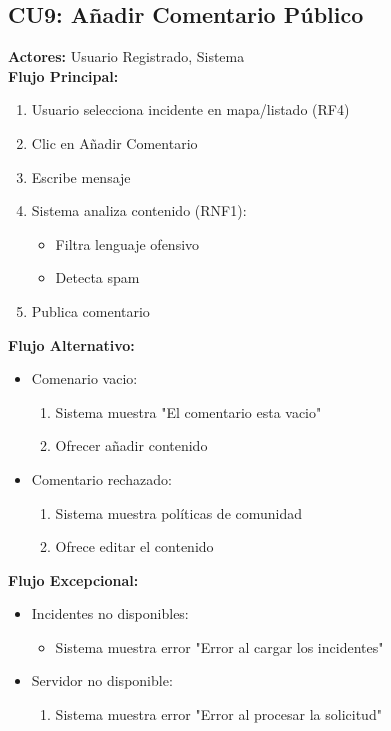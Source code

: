 \begin{multicols}{2}
\subsection*{CU9: Añadir Comentario Público}
\textbf{Actores:} Usuario Registrado, Sistema\\
\textbf{Flujo Principal:}
\begin{enumerate}
    \item Usuario selecciona incidente en mapa/listado (RF4)
    \item Clic en Añadir Comentario
    \item Escribe mensaje
    \item Sistema analiza contenido (RNF1):
    \begin{itemize}
        \item Filtra lenguaje ofensivo
        \item Detecta spam
    \end{itemize}
    \item Publica comentario
\end{enumerate}

\textbf{Flujo Alternativo:}
\begin{itemize}
    \item Comenario vacio:
    \begin{enumerate}
        \item Sistema muestra "El comentario esta vacio"
        \item Ofrecer añadir contenido
    \end{enumerate}
    \item Comentario rechazado:
    \begin{enumerate}
        \item Sistema muestra políticas de comunidad
        \item Ofrece editar el contenido
    \end{enumerate}
\end{itemize}

\textbf{Flujo Excepcional:}
\begin{itemize}
    \item Incidentes no disponibles:
    \begin{itemize}
        \item Sistema muestra error "Error al cargar los incidentes"
    \end{itemize}
    \item Servidor no disponible:
    \begin{enumerate}
        \item Sistema muestra error "Error al procesar la solicitud"
    \end{enumerate}
\end{itemize}


\end{multicols}

